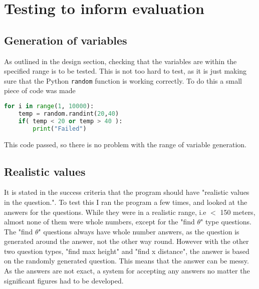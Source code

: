 \chapter{Testing to inform evaluation}
\section{Generation of variables}
As outlined in the design section, checking that the variables are within the specified range is to be tested. This is not too hard to test, as it is just making sure that the Python \texttt{random} function is working correctly. To do this a small piece of code was made 
\begin{lstlisting}[language=Python, caption=Variable range test]
for i in range(1, 10000):
	temp = random.randint(20,40)
	if( temp < 20 or temp > 40 ):
		print("Failed")
\end{lstlisting}
This code passed, so there is no problem with the range of variable generation.
\section{Realistic values}
It is stated in the success criteria that the program should have "realistic values in the question.". To test this I ran the program a few times, and looked at the answers for the questions. While they were in a realistic range, i.e $<$ 150 meters, almost none of them were whole numbers, except for the "find $\theta$" type questions. The "find $\theta$" questions always have whole number answers, as the question is generated around the answer, not the other way round. However with the other two question types, "find max height" and "find x distance", the answer is based on the randomly generated question. This means that the answer can be messy. As the answers are not exact, a system for accepting any answers no matter the significant figures had to be developed.
